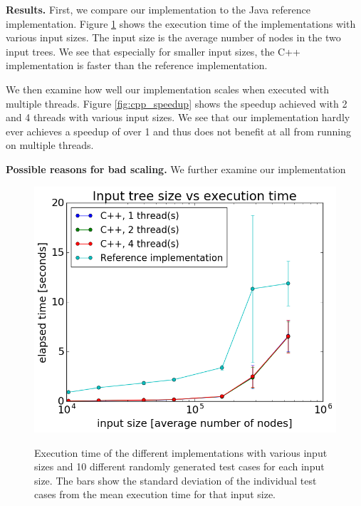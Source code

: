 \documentclass[letterpaper]{article}
\newcommand{\mypar}[1]{{\bf #1.}}
\begin{document}
\mypar{Results}
First, we compare our implementation to the Java reference implementation.
Figure \ref{fig:cpp_vs_java} shows the execution time of the implementations with various input sizes.
The input size is the average number of nodes in the two input trees.
We see that especially for smaller input sizes, the C++ implementation is faster than the reference implementation.

We then examine how well our implementation scales when executed with multiple threads.
Figure \ref{fig:cpp_speedup} shows the speedup achieved with 2 and 4 threads with various input sizes.
We see that our implementation hardly ever achieves a speedup of over 1 and thus does not benefit at all from running on multiple threads.

\mypar{Possible reasons for bad scaling}
We further examine our implementation 

\begin{figure}
	\includegraphics[width=\linewidth]{timePlot_with_java}
	\label{fig:cpp_vs_java}
	\caption{Execution time of the different implementations with various input sizes and 10 different randomly generated test cases for each input size. The bars show the standard deviation of the individual test cases from the mean execution time for that input size.}
\end{figure}
\end{document}
